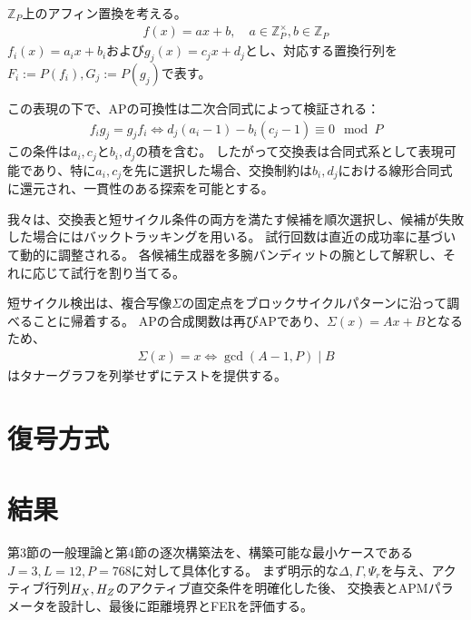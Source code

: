 \documentclass[a4paper,11pt,dvipdfmx]{jsarticle}
\theoremstyle{definition}
\begin{document}
$\mathbb{Z}_P$上のアフィン置換を考える。
\begin{align}
  f(x) = ax+b,\quad a\in\mathbb{Z}_P^\times, b\in\mathbb{Z}_P
\end{align}
$f_i(x)=a_ix+b_i$および$g_j(x)=c_jx+d_j$とし、対応する置換行列を$F_i:=P(f_i),G_j:=P(g_j)$で表す。

この表現の下で、APの可換性は二次合同式によって検証される：
\begin{align}
  f_ig_j = g_jf_i\iff d_j(a_i-1) - b_i(c_j-1) \equiv 0 \mod P
\end{align}
この条件は$a_i, c_j$と$b_i, d_j$の積を含む。
したがって交換表は合同式系として表現可能であり、特に$a_i, c_j$を先に選択した場合、交換制約は$b_i, d_j$における線形合同式に還元され、一貫性のある探索を可能とする。

我々は、交換表と短サイクル条件の両方を満たす候補を順次選択し、候補が失敗した場合にはバックトラッキングを用いる。
試行回数は直近の成功率に基づいて動的に調整される。
各候補生成器を多腕バンディットの腕として解釈し、それに応じて試行を割り当てる。

短サイクル検出は、複合写像$\Sigma$の固定点をブロックサイクルパターンに沿って調べることに帰着する。
APの合成関数は再びAPであり、$\Sigma(x) = Ax + B$となるため、
\begin{align}
  \Sigma(x) = x\iff \gcd(A-1,P)\mid B
\end{align}
はタナーグラフを列挙せずにテストを提供する。
\section{復号方式}
\section{結果}
第3節の一般理論と第4節の逐次構築法を、構築可能な最小ケースである$J = 3, L = 12, P = 768$に対して具体化する。
まず明示的な$\Delta, \Gamma, \Psi_r$を与え、アクティブ行列$H_X,H_Z$のアクティブ直交条件を明確化した後、
交換表とAPMパラメータを設計し、最後に距離境界とFERを評価する。
\end{document}
